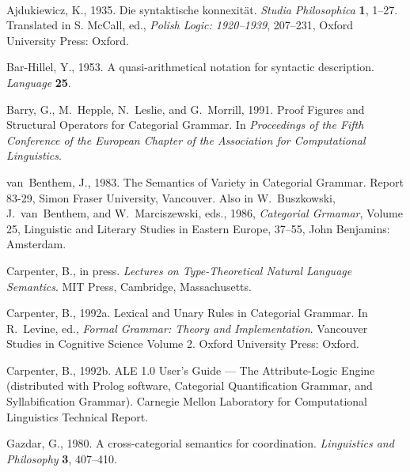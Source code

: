 %
\small
\begin{list}{\ }{\setlength{\listparindent}{-1.5in} 
                   \setlength{\itemindent}{-0.25in} 
                   \setlength{\itemsep}{0.0in}
                   \setlength{\leftmargin}{0.25in} 
                   \setlength{\labelwidth}{0.2in} 
                   \setlength{\labelsep}{0.1in} }

\item
Ajdukiewicz, K., 1935.
 Die syntaktische konnexit{\"{a}}t.
 {\it Studia Philosophica} {\bf 1}, 1--27.
 Translated in S. McCall, ed., {\it Polish Logic: 1920--1939}, 207--231,
 Oxford University Press: Oxford.  

\item
Bar-Hillel, Y., 1953.
 A quasi-arithmetical notation for syntactic description.
 {\it Language} {\bf 25}.

\item
Barry, G., M.~Hepple, N.~Leslie, and G.~Morrill, 1991.
Proof Figures and Structural Operators for Categorial Grammar.  In
{\it Proceedings of the Fifth Conference of the European Chapter of
the Association for Computational Linguistics}.

\item
van~Benthem, J., 1983.  The Semantics of Variety in Categorial
Grammar.  Report 83-29, Simon Fraser University, Vancouver.  Also in
W.~Buszkowski, J.~van~Benthem, and W.~Marciszewski, eds., 
1986, {\it Categorial Grmamar}, Volume 25, Linguistic and Literary
Studies in Eastern Europe, 37--55, John Benjamins: Amsterdam.

\item
Carpenter, B., in press.
{\it Lectures on Type-Theoretical Natural Language Semantics}.
MIT Press, Cambridge, Massachusetts.

\item
Carpenter, B., 1992a.
Lexical and Unary Rules in Categorial Grammar.
In R.~Levine, ed., {\it Formal Grammar: Theory and Implementation}.
Vancouver Studies in Cognitive Science Volume 2.  Oxford University
Press: Oxford.

   \item
     Carpenter, B.,
     1992b.
     ALE 1.0 User's Guide --- The Attribute-Logic Engine
     (distributed with Prolog software, Categorial
      Quantification Grammar, and Syllabification Grammar).
     Carnegie Mellon Laboratory for Computational Linguistics 
     Technical Report.

\item
Gazdar, G., 1980.
 A cross-categorial semantics for coordination.
 {\it Linguistics and Philosophy} {\bf 3}, 407--410.


\end{list}
